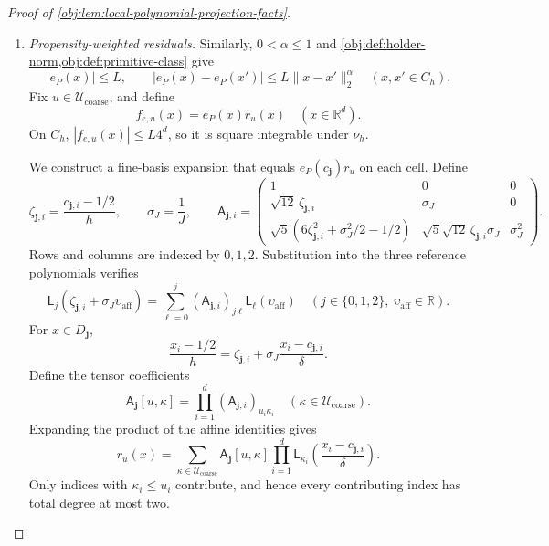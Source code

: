 \begin{proof}[Proof of \cref{obj:lem:local-polynomial-projection-facts}]
\begin{enumerate}
\item \emph{Propensity-weighted residuals.}
Similarly, \(0<\alpha\le1\) and
\cref{obj:def:holder-norm,obj:def:primitive-class} give
\[
|e_P(x)|\le L,
\qquad
|e_P(x)-e_P(x')|\le L\|x-x'\|_2^\alpha
\quad(x,x'\in C_h).
\]
Fix \(u\in\mathcal U_{\mathrm{coarse}}\), and define
\[
f_{e,u}(x)=e_P(x)r_u(x)
\quad(x\in\mathbb R^d).
\]
On \(C_h\), \(|f_{e,u}(x)|\le L4^d\), so it is square integrable
under \(\nu_h\).

We construct a fine-basis expansion that equals
\(e_P(c_{\mathbf j})r_u\) on each cell. Define
\[
\zeta_{\mathbf j,i}=\frac{c_{\mathbf j,i}-1/2}{h},
\qquad
\sigma_J=\frac1J,
\qquad
\mathsf A_{\mathbf j,i}=
\begin{pmatrix}
1&0&0\\
\sqrt{12}\,\zeta_{\mathbf j,i}&\sigma_J&0\\
\sqrt5(6\zeta_{\mathbf j,i}^2+\sigma_J^2/2-1/2)
 &\sqrt5\sqrt{12}\,\zeta_{\mathbf j,i}\sigma_J&\sigma_J^2
\end{pmatrix}.
\]
Rows and columns are indexed by \(0,1,2\). Substitution into the three
reference polynomials verifies
\[
\mathsf L_j(\zeta_{\mathbf j,i}+\sigma_J\upsilon_{\mathrm{aff}})
 =
 \sum_{\ell=0}^j
 (\mathsf A_{\mathbf j,i})_{j\ell}
 \mathsf L_\ell(\upsilon_{\mathrm{aff}})
\quad(j\in\{0,1,2\},\ \upsilon_{\mathrm{aff}}\in\mathbb R).
\]
For \(x\in D_{\mathbf j}\),
\[
\frac{x_i-1/2}{h}
 =\zeta_{\mathbf j,i}
   +\sigma_J\frac{x_i-c_{\mathbf j,i}}{\delta}.
\]
Define the tensor coefficients
\[
\mathsf A_{\mathbf j}[u,\kappa]
 =\prod_{i=1}^d(\mathsf A_{\mathbf j,i})_{u_i\kappa_i}
 \quad(\kappa\in\mathcal U_{\mathrm{coarse}}).
\]
Expanding the product of the affine identities gives
\[
r_u(x)=
 \sum_{\kappa\in\mathcal U_{\mathrm{coarse}}}
 \mathsf A_{\mathbf j}[u,\kappa]
 \prod_{i=1}^d
 \mathsf L_{\kappa_i}\!\left(\frac{x_i-c_{\mathbf j,i}}{\delta}\right).
\]
Only indices with \(\kappa_i\le u_i\) contribute, and hence every
contributing index has total degree at most two.


\end{enumerate}
\end{proof}
